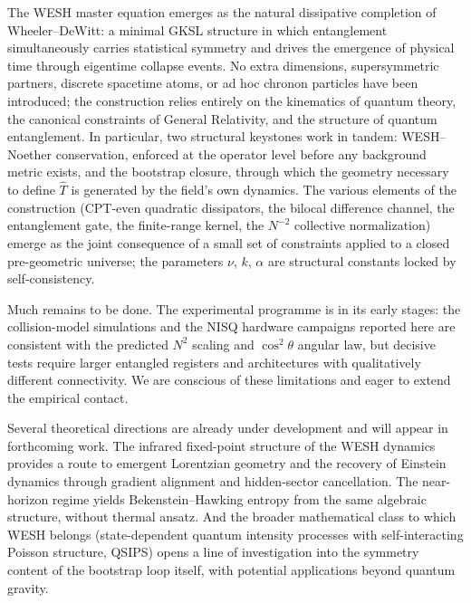 \documentclass[12pt,a4paper]{article}
\numberwithin{equation}{section}
\begin{document}
\vspace{0.3cm}
\noindent The WESH master equation emerges as the natural dissipative completion of Wheeler--DeWitt: a minimal GKSL structure in which entanglement simultaneously carries statistical symmetry and drives the emergence of physical time through eigentime collapse events. No extra dimensions, supersymmetric partners, discrete spacetime atoms, or ad hoc chronon particles have been introduced; the construction relies entirely on the kinematics of quantum theory, the canonical constraints of General Relativity, and the structure of quantum entanglement. In particular, two structural keystones work in tandem: WESH--Noether conservation, enforced at the operator level before any background metric exists, and the bootstrap closure, through which the geometry necessary to define $\hat{T}$ is generated by the field's own dynamics. The various elements of the construction (CPT-even quadratic dissipators, the bilocal difference channel, the entanglement gate, the finite-range kernel, the $N^{-2}$ collective normalization) emerge as the joint consequence of a small set of constraints applied to a closed pre-geometric universe; the parameters $\nu$, $k$, $\alpha$ are structural constants locked by self-consistency.

\vspace{0.3cm}
\noindent Much remains to be done. The experimental programme is in its early stages: the collision-model simulations and the NISQ hardware campaigns reported here are consistent with the predicted $N^2$ scaling and $\cos^2\theta$ angular law, but decisive tests require larger entangled registers and architectures with qualitatively different connectivity. We are conscious of these limitations and eager to extend the empirical contact.

\vspace{0.3cm}
\noindent Several theoretical directions are already under development and will appear in forthcoming work. The infrared fixed-point structure of the WESH dynamics provides a route to emergent Lorentzian geometry and the recovery of Einstein dynamics through gradient alignment and hidden-sector cancellation. The near-horizon regime yields Bekenstein--Hawking entropy from the same algebraic structure, without thermal ansatz. And the broader mathematical class to which WESH belongs (state-dependent quantum intensity processes with self-interacting Poisson structure, QSIPS) opens a line of investigation into the symmetry content of the bootstrap loop itself, with potential applications beyond quantum gravity.
\end{document}
